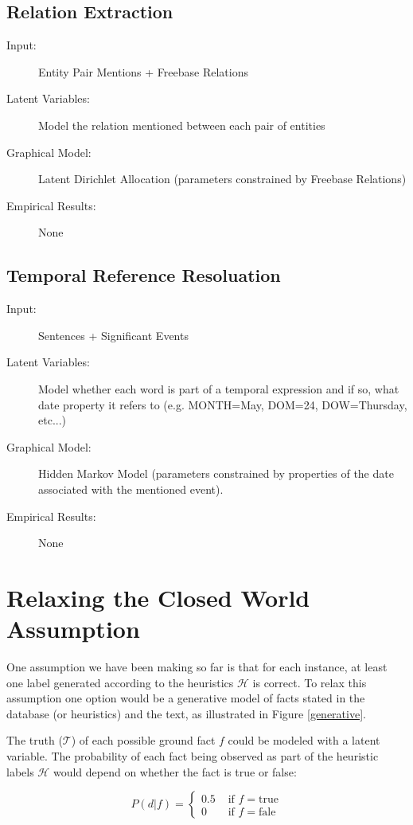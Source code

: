 \documentclass[12pt]{article}
\begin{document}
\subsection{Relation Extraction}
\begin{description}
\item[Input:] Entity Pair Mentions + Freebase Relations
\item[Latent Variables:] Model the relation mentioned between each pair of entities
\item[Graphical Model:] Latent Dirichlet Allocation (parameters constrained by Freebase Relations)
\item[Empirical Results:] None
\end{description}

\subsection{Temporal Reference Resoluation}
\begin{description}
\item[Input:] Sentences + Significant Events
\item[Latent Variables:] Model whether each word is part of a temporal expression and if so, what date property it refers to (e.g. MONTH=May, DOM=24, DOW=Thursday, etc...)
\item[Graphical Model:] Hidden Markov Model (parameters constrained by properties of the date associated with the mentioned event).
\item[Empirical Results:] None
\end{description}

\section{Relaxing the Closed World Assumption}
One assumption we have been making so far is that for each instance, at least one label generated according to the heuristics $\mathcal{H}$ is correct.
To relax this assumption one option would be a generative model of facts stated in the database (or heuristics) and the text, as illustrated in
Figure \ref{generative}.

The truth ($\mathcal{T}$) of each possible ground fact $f$ could be modeled with a latent variable.  The probability of each fact being observed
as part of the heuristic labels $\mathcal{H}$ would depend on whether the fact is true or false:

$$
P(d|f) = \left\{ \begin{array}{rl}
 0.5 &\mbox{ if $f=\text{true}$} \\
 0   &\mbox{ if $f=\text{fale}$}
       \end{array} \right.
$$
\end{document}
